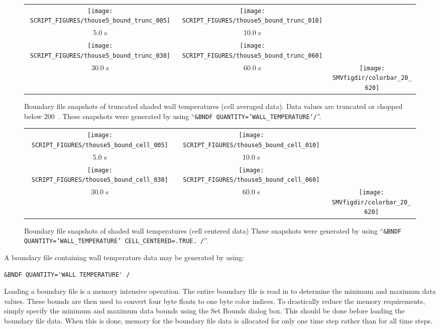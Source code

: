 \documentclass[11pt,twoside]{book}
\newcommand{\figheightAbar}{2.2in}
\begin{document}
\begin{figure}[bph]
\begin{center}
\begin{tabular}{ccc}
\texttt{[image: SCRIPT\_FIGURES/thouse5\_bound\_trunc\_005]}&
\texttt{[image: SCRIPT\_FIGURES/thouse5\_bound\_trunc\_010]}\\
5.0 s&10.0 s\\
\texttt{[image: SCRIPT\_FIGURES/thouse5\_bound\_trunc\_030]}&
\texttt{[image: SCRIPT\_FIGURES/thouse5\_bound\_trunc\_060]}\\
30.0 s&60.0 s
&\raisebox{0.0ex}[0pt]{\texttt{[image: \\SMVfigdir/colorbar\_20\_620]}}\\
\end{tabular}
\end{center}
\caption [Boundary file snapshots of truncated shaded wall
temperatures contours (cell averaged data).] {Boundary file
snapshots of truncated shaded wall temperatures (cell averaged
data).  Data values are truncated or chopped below 200~\degC.
These snapshots were generated by using ``{\tt\&BNDF
QUANTITY='WALL\_TEMPERATURE'/}''. }
\label{figtruncboundary}%
\end{figure}

\begin{figure}[bph]
\begin{center}
\begin{tabular}{ccc}
\texttt{[image: SCRIPT\_FIGURES/thouse5\_bound\_cell\_005]}&
\texttt{[image: SCRIPT\_FIGURES/thouse5\_bound\_cell\_010]}\\
5.0 s&10.0 s\\
\texttt{[image: SCRIPT\_FIGURES/thouse5\_bound\_cell\_030]}&
\texttt{[image: SCRIPT\_FIGURES/thouse5\_bound\_cell\_060]}\\
30.0 s&60.0 s
&\raisebox{0.0ex}[0pt]{\texttt{[image: \\SMVfigdir/colorbar\_20\_620]}}\\
\end{tabular}
\end{center}
\caption [Boundary file snapshots of shaded wall temperatures
contours (cell centered data).] {Boundary file snapshots of shaded
wall temperatures (cell centered data) These snapshots were
generated by using ``{\tt\&BNDF QUANTITY='WALL\_TEMPERATURE'
CELL\_CENTERED=.TRUE. /}''. }
\label{figboundary_cell_centered}%
\end{figure}
A boundary file containing wall temperature data may be generated
by using:
\begin{lstlisting}
&BNDF QUANTITY='WALL TEMPERATURE' /
\end{lstlisting}
Loading a boundary file is a memory intensive operation.  The
entire boundary file is read in to determine the minimum and
maximum data values.  These bounds are then used to convert four
byte floats to one byte color indices.  To drastically reduce the
memory requirements, simply specify the minimum and maximum data
bounds using the Set Bounds dialog box.  This should be
done before loading the boundary file data.  When this is done,
memory for the boundary file data is allocated for only one time
step rather than for all time steps.
\end{document}

